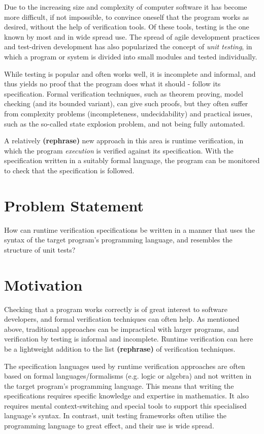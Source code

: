 \documentclass[a4paper,11pt]{kth-mag}
\newcommand{\rephrase}{\textbf{(rephrase)} }
\begin{document}
Due to the increasing size and complexity of computer software it has become more difficult,
if not impossible, to convince oneself that the program works as desired, without the help
of verification tools. Of these tools, testing is the one known by most and in wide spread use.
The spread of agile development practices and test-driven development has also popularized the
concept of \textit{unit testing}, in which a program or system is divided into small modules
and tested individually.

While testing is popular and often works well, it is incomplete and informal, and thus yields
no proof that the program does what it should - follow its specification. Formal verification
techniques, such as theorem proving, model checking (and its bounded variant), can give such
proofs, but they often suffer from complexity problems (incompleteness, undecidability) and
practical issues, such as the so-called state explosion problem, and not being fully automated.

A relatively \rephrase new approach in this area is runtime verification, in which the
program \textit{execution} is verified against its specification. With the specification written
in a suitably formal language, the program can be monitored to check that the specification is
followed.


\section{Problem Statement}

How can runtime verification specifications be written in a manner that uses
the syntax of the target program’s programming language, and resembles
the structure of unit tests?

\section{Motivation}

Checking that a program works correctly is of great interest to software developers, and
formal verification techniques can often help. As mentioned above, traditional approaches
can be impractical with larger programs, and verification by testing is
informal and incomplete. Runtime verification can here be a lightweight addition to the list \rephrase of verification techniques.

The specification languages used by runtime verification approaches are often based
on formal languages/formalisms (e.g. logic or algebra) and not written in the
target program's programming language.  This means that writing the specifications
requires specific knowledge and expertise in mathematics. 
It also requires mental context-switching and special tools
to support this specialised language's syntax. In contrast, unit testing frameworks often
utilise the programming language to great effect, and their use is wide spread.
\end{document}
